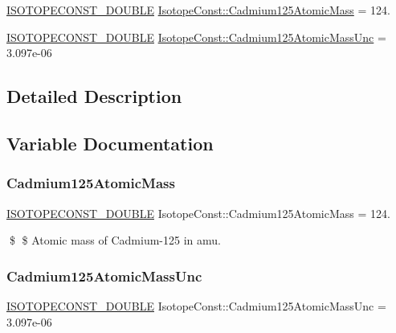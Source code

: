 \begin{DoxyCompactItemize}
\item 
\mbox{\hyperlink{group___isotope_const-_macros_ga8f45a7272ce02c0b4c65c44636ed719a}{I\+S\+O\+T\+O\+P\+E\+C\+O\+N\+S\+T\+\_\+\+D\+O\+U\+B\+LE}} \mbox{\hyperlink{group___isotope_const-_cadmium-_cd125_ga967688b3cd78fad2f2146752e67549f8}{Isotope\+Const\+::\+Cadmium125\+Atomic\+Mass}} = 124.
\item 
\mbox{\hyperlink{group___isotope_const-_macros_ga8f45a7272ce02c0b4c65c44636ed719a}{I\+S\+O\+T\+O\+P\+E\+C\+O\+N\+S\+T\+\_\+\+D\+O\+U\+B\+LE}} \mbox{\hyperlink{group___isotope_const-_cadmium-_cd125_gacf266b263a4844e9122e9ec84e7518d2}{Isotope\+Const\+::\+Cadmium125\+Atomic\+Mass\+Unc}} = 3.\+097e-\/06
\end{DoxyCompactItemize}


\subsection{Detailed Description}


\subsection{Variable Documentation}
\mbox{\label{group___isotope_const-_cadmium-_cd125_ga967688b3cd78fad2f2146752e67549f8}} 
\subsubsection{\texorpdfstring{Cadmium125\+Atomic\+Mass}{Cadmium125AtomicMass}}
{\footnotesize\ttfamily \mbox{\hyperlink{group___isotope_const-_macros_ga8f45a7272ce02c0b4c65c44636ed719a}{I\+S\+O\+T\+O\+P\+E\+C\+O\+N\+S\+T\+\_\+\+D\+O\+U\+B\+LE}} Isotope\+Const\+::\+Cadmium125\+Atomic\+Mass = 124.}

\$ \$ Atomic mass of Cadmium-\/125 in amu. \mbox{\label{group___isotope_const-_cadmium-_cd125_gacf266b263a4844e9122e9ec84e7518d2}} 
\subsubsection{\texorpdfstring{Cadmium125\+Atomic\+Mass\+Unc}{Cadmium125AtomicMassUnc}}
{\footnotesize\ttfamily \mbox{\hyperlink{group___isotope_const-_macros_ga8f45a7272ce02c0b4c65c44636ed719a}{I\+S\+O\+T\+O\+P\+E\+C\+O\+N\+S\+T\+\_\+\+D\+O\+U\+B\+LE}} Isotope\+Const\+::\+Cadmium125\+Atomic\+Mass\+Unc = 3.\+097e-\/06}

